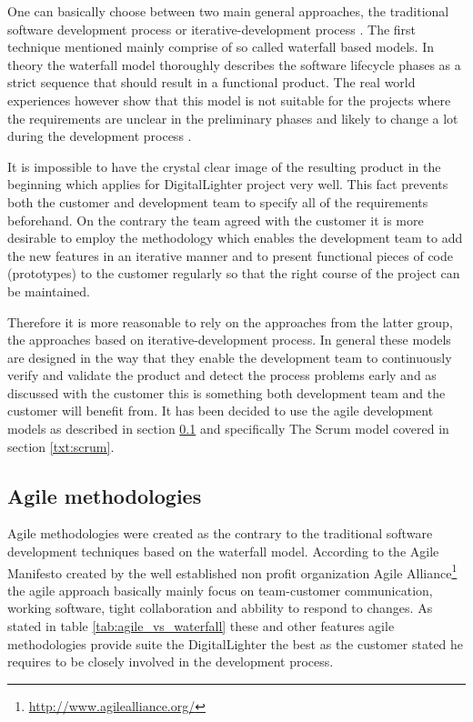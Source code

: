 One can basically choose between two main general approaches, the traditional software development process or iterative-development process \cite{fairley2009managing}. The first technique mentioned mainly comprise of so called waterfall based models. In theory the waterfall model thoroughly describes the software lifecycle phases as a strict sequence that should result in a functional product. The real world experiences however show that this model is not suitable for the projects where the requirements are unclear in the preliminary phases and likely to change a lot during the development process \cite{john2011software}.

It is impossible to have the crystal clear image of the resulting product in the beginning\cite{fairley2009managing} which applies for DigitalLighter project very well.  This fact prevents both the customer and development team to specify all of the requirements beforehand. On the contrary the team agreed with the customer it is more desirable to employ the methodology which enables the development team to add the new features in an iterative manner and to present functional pieces of code (prototypes) to the customer regularly so that the right course of the project can be maintained.

Therefore it is more reasonable to rely on the approaches from the latter group, the approaches based on iterative-development process. In general these models are designed in the way that they enable the development team to continuously verify and validate the product and detect the process problems early and as discussed with the customer this is something both development team and the customer will benefit from. It has been decided to use the agile development models as described in section \ref{txt:agile_methodologies} and specifically The Scrum model covered in section \ref{txt:scrum}.

\subsection{Agile methodologies} \label{txt:agile_methodologies}
Agile methodologies were created as the contrary to the traditional software development techniques based on the waterfall model. According to the Agile Manifesto \cite{agileManifesto} created by the well established non profit organization Agile Alliance\footnote{\url{http://www.agilealliance.org/}} the agile approach basically mainly focus on team-customer communication, working software, tight collaboration and abbility to respond to changes. As stated in table \ref{tab:agile_vs_waterfall} these and other features agile methodologies provide suite the DigitalLighter the best as the customer stated he requires to be closely involved in the development process.

